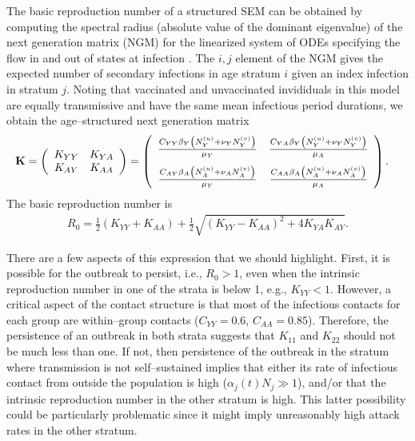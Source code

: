The basic reproduction number of a structured SEM can be obtained by computing the spectral radius (absolute value of the dominant eigenvalue) of the next generation matrix (NGM) for the linearized system of ODEs specifying the flow in and out of states at infection \cite{heffernan2005perspectives,van2017reproduction,van2008further}. The $ i,j $ element of the NGM gives the expected number of secondary infections in age stratum $ i $ given an index infection in stratum $ j $. Noting that vaccinated and unvaccinated invididuals in this model are equally transmissive and have the same mean infectious period durations, we obtain the age--structured next generation matrix
\begin{align}
\label{eqn:sirs_ngm_full}
\mathbf{K} &= 
	\left (
	\begin{array}{cc}
	K_{YY} & K_{YA} \\
	K_{AY} & K_{AA}
	\end{array}
	\right ) =\left (
	\begin{array}{cc}
	\frac{C_{YY}\beta_Y\left (N_Y^{(u)} + \nu_YN_Y^{(v)}\right )}{\mu_Y} & \frac{C_{YA}\beta_Y\left (N_Y^{(u)} + \nu_YN_Y^{(v)}\right )}{\mu_A} \\[2ex]
	\frac{C_{AY}\beta_A\left (N_A^{(u)} + \nu_AN_A^{(v)}\right )}{\mu_Y} & \frac{C_{AA}\beta_A\left (N_A^{(u)} + \nu_AN_A^{(v)}\right )}{\mu_A}
	\end{array}
	\right ).
\end{align}
The basic reproduction number is 
\begin{align}
\label{eqn:sirs_R0}
R_0 = \frac{1}{2}\left (K_{YY} + K_{AA}\right ) + \frac{1}{2}\sqrt{(K_{YY} - K_{AA})^2 + 4K_{YA}K_{AY}}.
\end{align}

There are a few aspects of this expression that we should highlight. First, it is possible for the outbreak to persist, i.e., $ R_0 > 1 $, even when the intrinsic reproduction number in one of the strata is below 1, e.g., $ K_{YY} <1$. However, a critical aspect of the contact structure is that most of the infectious contacts for each group are within--group contacts ($ C_{YY} = 0.6 $, $ C_{AA}=0.85 $). Therefore, the persistence of an outbreak in both strata suggests that $ K_{11} $ and $ K_{22} $ should not be much less than one. If not, then persistence of the outbreak in the stratum where transmission is not self--sustained implies that either its rate of infectious contact from outside the population is high ($ \alpha_j(t)N_j \gg  1$), and/or that the intrinsic reproduction number in the other stratum is high. This latter possibility could be particularly problematic since it might imply unreasonably high attack rates in the other stratum.

